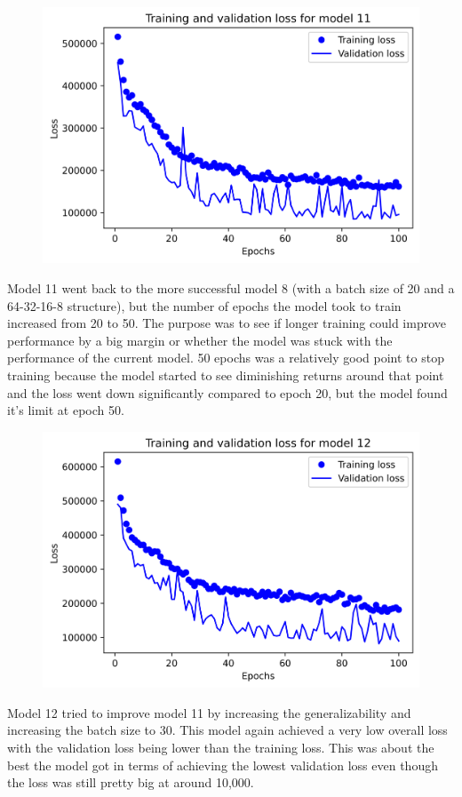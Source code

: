 \documentclass{article}
\begin{document}
    \begin{figure}[H]
        \includegraphics[width=\linewidth]{images/model11.png}
    \end{figure}
    Model 11 went back to the more successful model 8 (with a batch size of 20 and a 64-32-16-8 structure), but the 
    number of epochs the model took to train increased from 20 to 50. The purpose was to see if longer training 
    could improve performance by a big margin or whether the model was stuck with the performance of the current model. 
    50 epochs was a relatively good point to stop training because the model started to see diminishing returns around 
    that point and the loss went down significantly compared to epoch 20, but the model found it's limit at epoch 50.

    \begin{figure}[H]
        \includegraphics[width=\linewidth]{images/model12.png}
    \end{figure}
    Model 12 tried to improve model 11 by increasing the generalizability and increasing the batch size to 30. This model 
    again achieved a very low overall loss with the validation loss being lower than the training loss. This was about the 
    best the model got in terms of achieving the lowest validation loss even though the loss was still pretty big at around 10,000.
\end{document}
